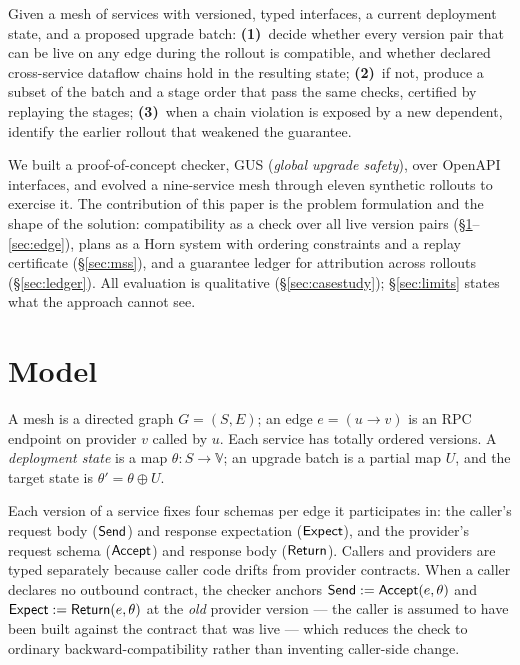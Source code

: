 \begin{tcolorbox}[colback=black!4,colframe=black!60,title=\textbf{Problem statement}]
\small
Given a mesh of services with versioned, typed interfaces, a current
deployment state, and a proposed upgrade batch:
\textbf{(1)}~decide whether every version pair that can be live on any
edge during the rollout is compatible, and whether declared
cross-service dataflow chains hold in the resulting state;
\textbf{(2)}~if not, produce a subset of the batch and a stage order
that pass the same checks, certified by replaying the stages;
\textbf{(3)}~when a chain violation is exposed by a new dependent,
identify the earlier rollout that weakened the guarantee.
\end{tcolorbox}

We built a proof-of-concept checker, GUS (\emph{global upgrade
safety}), over OpenAPI interfaces, and evolved a nine-service mesh
through eleven synthetic rollouts to exercise it. The contribution of
this paper is the problem formulation and the shape of the solution:
compatibility as a check over all live version pairs
(\S\ref{sec:model}--\ref{sec:edge}), plans as a Horn system with
ordering constraints and a replay certificate (\S\ref{sec:mss}), and a
guarantee ledger for attribution across rollouts
(\S\ref{sec:ledger}). All evaluation is qualitative
(\S\ref{sec:casestudy}); \S\ref{sec:limits} states what the approach
cannot see.


\section{Model}
\label{sec:model}

A mesh is a directed graph $G = (S, E)$; an edge $e = (u \to v)$ is an
RPC endpoint on provider $v$ called by $u$. Each service has totally
ordered versions. A \emph{deployment state} is a map
$\theta : S \to \mathbb{V}$; an upgrade batch is a partial map $U$,
and the target state is $\theta' = \theta \oplus U$.

Each version of a service fixes four schemas per edge it participates
in: the caller's request body ($\mathsf{Send}$) and response expectation
($\mathsf{Expect}$), and the provider's request schema ($\mathsf{Accept}$) and
response body ($\mathsf{Return}$). Callers and providers are typed separately
because caller code drifts from provider contracts. When a caller
declares no outbound contract, the checker anchors
$\mathsf{Send} := \mathsf{Accept}(e,\theta)$ and $\mathsf{Expect} := \mathsf{Return}(e,\theta)$ at the
\emph{old} provider version --- the caller is assumed to have been
built against the contract that was live --- which reduces the check
to ordinary backward-compatibility rather than inventing caller-side
change.

